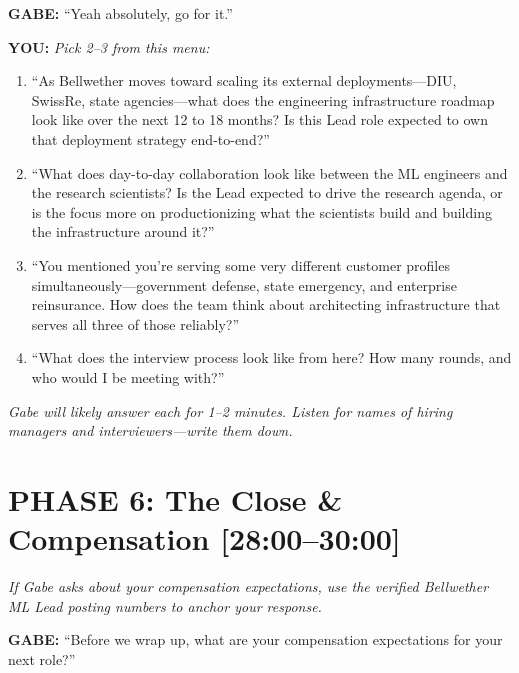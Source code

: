 \documentclass[11pt,letterpaper]{article}
\newenvironment{gabe}{\begin{mdframed}[backgroundcolor=gabebg,linewidth=0pt,innertopmargin=8pt,innerbottommargin=8pt]\textbf{\color{xred}GABE:} }{\end{mdframed}}
\newenvironment{you}{\begin{mdframed}[backgroundcolor=youbg,linewidth=0pt,innertopmargin=8pt,innerbottommargin=8pt]\textbf{\color{xblue}YOU:} }{\end{mdframed}}
\newcommand{\stage}[1]{{\small\color{xgray}\textit{#1}}}
\begin{document}
\begin{gabe}
``Yeah absolutely, go for it.''
\end{gabe}

\begin{you}
\textit{Pick 2--3 from this menu:}
\begin{enumerate}[leftmargin=*]
    \item ``As Bellwether moves toward scaling its external deployments---DIU, SwissRe, state agencies---what does the engineering infrastructure roadmap look like over the next 12 to 18 months? Is this Lead role expected to own that deployment strategy end-to-end?''

    \item ``What does day-to-day collaboration look like between the ML engineers and the research scientists? Is the Lead expected to drive the research agenda, or is the focus more on productionizing what the scientists build and building the infrastructure around it?''

    \item ``You mentioned you're serving some very different customer profiles simultaneously---government defense, state emergency, and enterprise reinsurance. How does the team think about architecting infrastructure that serves all three of those reliably?''

    \item ``What does the interview process look like from here? How many rounds, and who would I be meeting with?''
\end{enumerate}
\end{you}

\stage{Gabe will likely answer each for 1--2 minutes. Listen for names of hiring managers and interviewers---write them down.}

\section*{PHASE 6: The Close \& Compensation {\color{xgray}\normalsize[28:00--30:00]}}

\stage{If Gabe asks about your compensation expectations, use the verified Bellwether ML Lead posting numbers to anchor your response.}

\begin{gabe}
``Before we wrap up, what are your compensation expectations for your next role?''
\end{gabe}
\end{document}

